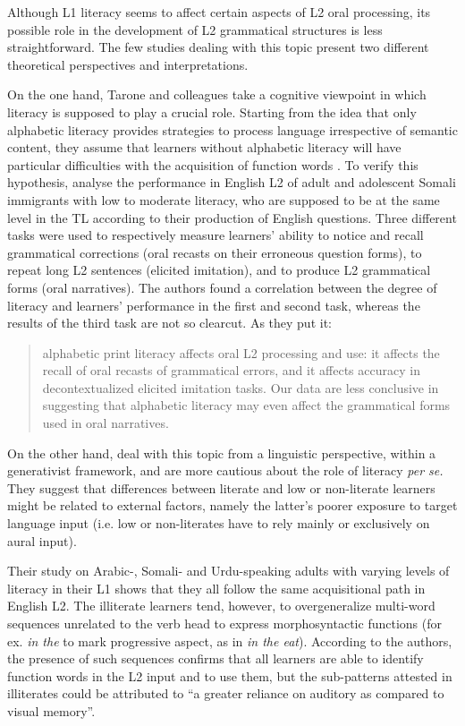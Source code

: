 \documentclass[output=paper]{langscibook}
\begin{document}
Although L1 literacy seems to affect certain aspects of L2 oral processing, its possible role in the development of L2 grammatical structures is less straightforward. The few studies dealing with this topic present two different theoretical perspectives and interpretations.

On the one hand, Tarone and colleagues take a cognitive viewpoint in which literacy is supposed to play a crucial role. Starting from the idea that only alphabetic literacy provides strategies to process language irrespective of semantic content, they assume that learners without alphabetic literacy will have particular difficulties with the acquisition of function words \citep{TaroneEtAl2005}. To verify this hypothesis, \citet{TaroneEtAl2007} analyse the performance in English L2 of adult and adolescent Somali immigrants with low to moderate literacy, who are supposed to be at the same level in the TL according to their production of English questions. Three different tasks were used to respectively measure learners’ ability to notice and recall grammatical corrections (oral recasts on their erroneous question forms), to repeat long L2 sentences (elicited imitation), and to produce L2 grammatical forms (oral narratives). The authors found a correlation between the degree of literacy and learners’ performance in the first and second task, whereas the results of the third task are not so clearcut. As they put it:  

\begin{quote}
alphabetic print literacy affects oral L2 processing and use: it affects the recall of oral recasts of grammatical errors, and it affects accuracy in decontextualized elicited imitation tasks. Our data are less conclusive in suggesting that alphabetic literacy may even affect the grammatical forms used in oral narratives.\hbox{}\hfill\hbox{\citep[117]{TaroneEtAl2007}} 
\end{quote}

On the other hand, \citet{VainikkaEtAl2017} deal with this topic from a linguistic perspective, within a generativist framework, and are more cautious about the role of literacy \textit{per se.} They suggest that differences between literate and low or non-literate learners might be related to external factors, namely the latter’s poorer exposure to target language input (i.e. low or non-literates have to rely mainly or exclusively on aural input). 

Their study on Arabic-, Somali- and Urdu-speaking adults with varying levels of literacy in their L1 shows that they all follow the same acquisitional path in English L2. The illiterate learners tend, however, to overgeneralize multi-word sequences unrelated to the verb head to express morphosyntactic functions (for ex. \textit{in the} to mark progressive aspect, as in \textit{in the eat}). According to the authors, the presence of such sequences confirms that all learners are able to identify function words in the L2 input and to use them, but the sub-patterns attested in illiterates could be attributed to “a greater reliance on auditory as compared to visual memory”. 
\end{document}
